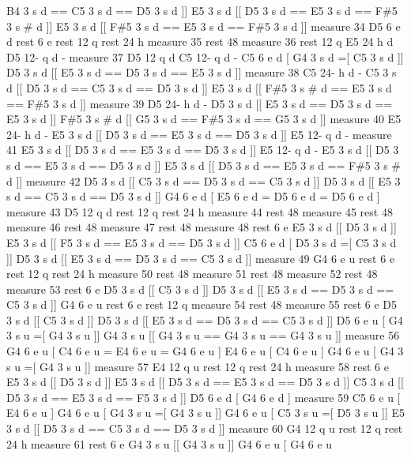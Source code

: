 B4 3 s d == C5 3 s d == D5 3 s d \mbox{]}\mbox{]} E5 3 s d \mbox{[}\mbox{[} D5 3 s d == E5 3 s d == F\#5 3 s \# d \mbox{]}\mbox{]} E5 3 s d \mbox{[}\mbox{[} F\#5 3 s d == E5 3 s d == F\#5 3 s d \mbox{]}\mbox{]} measure 34 D5 6 e d rest 6 e rest 12 q rest 24 h measure 35 rest 48 measure 36 rest 12 q E5 24 h d D5 12-\/ q d -\/ measure 37 D5 12 q d C5 12-\/ q d -\/ C5 6 e d \mbox{[} G4 3 s d =\mbox{[} C5 3 s d \mbox{]}\mbox{]} D5 3 s d \mbox{[}\mbox{[} E5 3 s d == D5 3 s d == E5 3 s d \mbox{]}\mbox{]} measure 38 C5 24-\/ h d -\/ C5 3 s d \mbox{[}\mbox{[} D5 3 s d == C5 3 s d == D5 3 s d \mbox{]}\mbox{]} E5 3 s d \mbox{[}\mbox{[} F\#5 3 s \# d == E5 3 s d == F\#5 3 s d \mbox{]}\mbox{]} measure 39 D5 24-\/ h d -\/ D5 3 s d \mbox{[}\mbox{[} E5 3 s d == D5 3 s d == E5 3 s d \mbox{]}\mbox{]} F\#5 3 s \# d \mbox{[}\mbox{[} G5 3 s d == F\#5 3 s d == G5 3 s d \mbox{]}\mbox{]} measure 40 E5 24-\/ h d -\/ E5 3 s d \mbox{[}\mbox{[} D5 3 s d == E5 3 s d == D5 3 s d \mbox{]}\mbox{]} E5 12-\/ q d -\/ measure 41 E5 3 s d \mbox{[}\mbox{[} D5 3 s d == E5 3 s d == D5 3 s d \mbox{]}\mbox{]} E5 12-\/ q d -\/ E5 3 s d \mbox{[}\mbox{[} D5 3 s d == E5 3 s d == D5 3 s d \mbox{]}\mbox{]} E5 3 s d \mbox{[}\mbox{[} D5 3 s d == E5 3 s d == F\#5 3 s \# d \mbox{]}\mbox{]} measure 42 D5 3 s d \mbox{[}\mbox{[} C5 3 s d == D5 3 s d == C5 3 s d \mbox{]}\mbox{]} D5 3 s d \mbox{[}\mbox{[} E5 3 s d == C5 3 s d == D5 3 s d \mbox{]}\mbox{]} G4 6 e d \mbox{[} E5 6 e d = D5 6 e d = D5 6 e d \mbox{]} measure 43 D5 12 q d rest 12 q rest 24 h measure 44 rest 48 measure 45 rest 48 measure 46 rest 48 measure 47 rest 48 measure 48 rest 6 e E5 3 s d \mbox{[}\mbox{[} D5 3 s d \mbox{]}\mbox{]} E5 3 s d \mbox{[}\mbox{[} F5 3 s d == E5 3 s d == D5 3 s d \mbox{]}\mbox{]} C5 6 e d \mbox{[} D5 3 s d =\mbox{[} C5 3 s d \mbox{]}\mbox{]} D5 3 s d \mbox{[}\mbox{[} E5 3 s d == D5 3 s d == C5 3 s d \mbox{]}\mbox{]} measure 49 G4 6 e u rest 6 e rest 12 q rest 24 h measure 50 rest 48 measure 51 rest 48 measure 52 rest 48 measure 53 rest 6 e D5 3 s d \mbox{[}\mbox{[} C5 3 s d \mbox{]}\mbox{]} D5 3 s d \mbox{[}\mbox{[} E5 3 s d == D5 3 s d == C5 3 s d \mbox{]}\mbox{]} G4 6 e u rest 6 e rest 12 q measure 54 rest 48 measure 55 rest 6 e D5 3 s d \mbox{[}\mbox{[} C5 3 s d \mbox{]}\mbox{]} D5 3 s d \mbox{[}\mbox{[} E5 3 s d == D5 3 s d == C5 3 s d \mbox{]}\mbox{]} D5 6 e u \mbox{[} G4 3 s u =\mbox{[} G4 3 s u \mbox{]}\mbox{]} G4 3 s u \mbox{[}\mbox{[} G4 3 s u == G4 3 s u == G4 3 s u \mbox{]}\mbox{]} measure 56 G4 6 e u \mbox{[} C4 6 e u = E4 6 e u = G4 6 e u \mbox{]} E4 6 e u \mbox{[} C4 6 e u \mbox{]} G4 6 e u \mbox{[} G4 3 s u =\mbox{[} G4 3 s u \mbox{]}\mbox{]} measure 57 E4 12 q u rest 12 q rest 24 h measure 58 rest 6 e E5 3 s d \mbox{[}\mbox{[} D5 3 s d \mbox{]}\mbox{]} E5 3 s d \mbox{[}\mbox{[} D5 3 s d == E5 3 s d == D5 3 s d \mbox{]}\mbox{]} C5 3 s d \mbox{[}\mbox{[} D5 3 s d == E5 3 s d == F5 3 s d \mbox{]}\mbox{]} D5 6 e d \mbox{[} G4 6 e d \mbox{]} measure 59 C5 6 e u \mbox{[} E4 6 e u \mbox{]} G4 6 e u \mbox{[} G4 3 s u =\mbox{[} G4 3 s u \mbox{]}\mbox{]} G4 6 e u \mbox{[} C5 3 s u =\mbox{[} D5 3 s u \mbox{]}\mbox{]} E5 3 s d \mbox{[}\mbox{[} D5 3 s d == C5 3 s d == D5 3 s d \mbox{]}\mbox{]} measure 60 G4 12 q u rest 12 q rest 24 h measure 61 rest 6 e G4 3 s u \mbox{[}\mbox{[} G4 3 s u \mbox{]}\mbox{]} G4 6 e u \mbox{[} G4 6 e u 